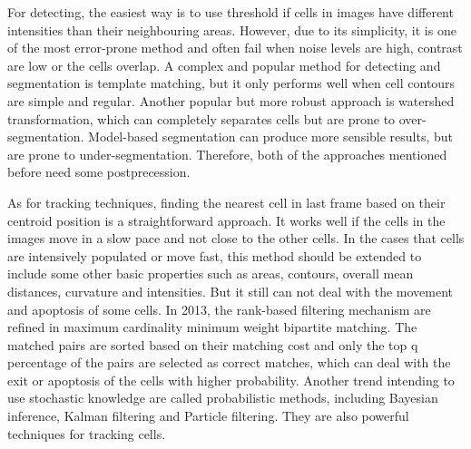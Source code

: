 \documentclass[conference]{IEEEtran}
\begin{document}
For detecting, the easiest way is to use threshold if cells in images have different intensities than their neighbouring areas\cite{b1}. However, due to its simplicity, it is one of the most error-prone method and often fail when noise levels are high, contrast are low or the cells overlap. A complex and popular method for detecting and segmentation is template matching, but it only performs well when cell contours are simple and regular\cite{b5}. Another popular but more robust approach is watershed transformation, which can completely separates cells but are prone to over-segmentation. Model-based segmentation can produce more sensible results, but are prone to under-segmentation. Therefore, both of the approaches mentioned before need some postprecession\cite{b6}. \par

As for tracking techniques, finding the nearest cell in last frame based on their centroid position is a  straightforward approach. It works well if the cells in the images move in a slow pace and not close to the other cells. In the cases that cells are intensively populated or move fast, this method should be extended to include some other basic properties such as areas, contours, overall mean distances, curvature and intensities\cite{b6}. But it still can not deal with the movement and apoptosis of some cells. In 2013, the rank-based filtering mechanism are refined in maximum cardinality minimum weight bipartite matching\cite{b3}. The matched pairs are sorted based on their matching cost and only the top q percentage of the pairs are selected as correct matches, which can deal with the exit or apoptosis of the cells with higher probability. Another trend intending to use stochastic knowledge are called probabilistic methods, including Bayesian inference, Kalman filtering and Particle filtering. They are also powerful techniques for tracking cells.\par
\end{document}
